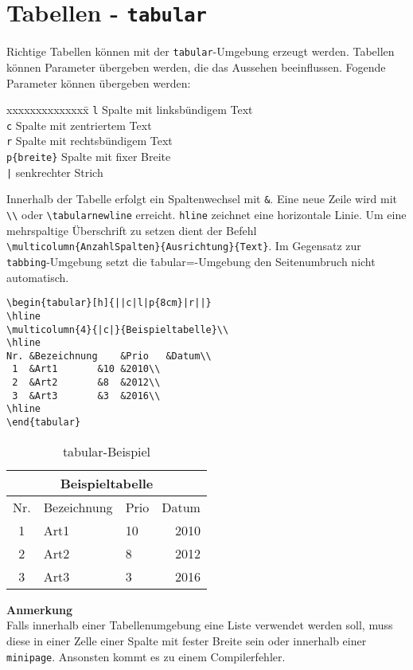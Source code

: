 \section{Tabellen - \texttt{tabular}}
Richtige Tabellen können mit der \verb=tabular=-Umgebung erzeugt werden. Tabellen können Parameter übergeben werden, die das Aussehen beeinflussen. Fogende Parameter können übergeben werden:
\begin{tabbing}
xxxxxxxxxxxxxx\=\kill
\verb=l= 			\>Spalte mit linksbündigem Text\\
\verb=c= 			\>Spalte mit zentriertem Text\\
\verb=r= 			\>Spalte mit rechtsbündigem Text\\
\verb=p{breite}= 	\>Spalte mit fixer Breite\\
\verb=|=			\>senkrechter Strich\\
\end{tabbing}
\newpage
Innerhalb der Tabelle erfolgt ein Spaltenwechsel mit \verb=&=. Eine neue Zeile wird mit \verb=\\= oder \verb=\tabularnewline= erreicht. \verb=hline= zeichnet eine horizontale Linie. Um eine mehrspaltige Überschrift zu setzen dient der Befehl \verb=\multicolumn{AnzahlSpalten}{Ausrichtung}{Text}=. Im Gegensatz zur \verb=tabbing=-Umgebung setzt die \=tabular=-Umgebung den Seitenumbruch nicht automatisch.
\begin{lstlisting}[caption={tabular-Beispiel}]
\begin{tabular}[h]{||c|l|p{8cm}|r||}
\hline
\multicolumn{4}{|c|}{Beispieltabelle}\\
\hline
Nr.	&Bezeichnung	&Prio	&Datum\\
 1	&Art1		&10	&2010\\
 2	&Art2		&8	&2012\\
 3	&Art3		&3	&2016\\
\hline
\end{tabular}
\end{lstlisting}
\begin{table}[H]
\centering
\begin{tabular}[h]{||c|l|p{8cm}|r||}
\hline
\multicolumn{4}{|c|}{Beispieltabelle}\\
\hline
Nr.	&Bezeichnung	&Prio	&Datum\\
 1	&Art1		&10	&2010\\
 2	&Art2		&8	&2012\\
 3	&Art3		&3	&2016\\
\hline
\end{tabular}
\caption{tabular-Beispiel}
\end{table}
\textbf{Anmerkung}\\
Falls innerhalb einer Tabellenumgebung eine Liste verwendet werden soll, muss diese in einer Zelle einer Spalte mit fester Breite sein oder innerhalb einer \verb=minipage=. Ansonsten kommt es zu einem Compilerfehler.
